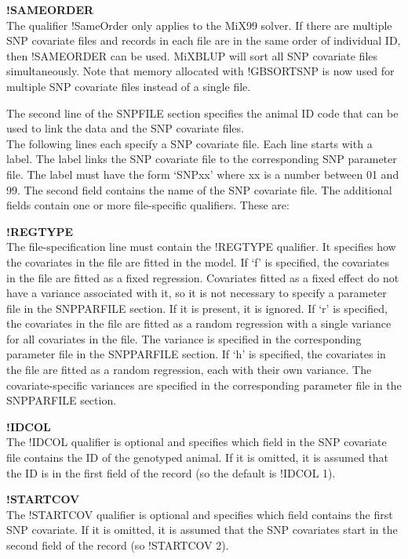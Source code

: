 \textbf{!SAMEORDER}\\
The qualifier !SameOrder only applies to the MiX99 solver. If there are
multiple SNP covariate files and records in each file are in the same
order of individual ID, then !SAMEORDER can be used. MiXBLUP will sort
all SNP covariate files simultaneously. Note that memory allocated with
!GBSORTSNP is now used for multiple SNP covariate files instead of a
single file.

The second line of the SNPFILE section specifies the animal ID code that
can be used to link the data and the SNP covariate files.\\
The following lines each specify a SNP covariate file. Each line starts
with a label. The label links the SNP covariate file to the
corresponding SNP parameter file. The label must have the form `SNPxx'
where xx is a number between 01 and 99. The second field contains the
name of the SNP covariate file. The additional fields contain one or
more file-specific qualifiers. These are:

\textbf{!REGTYPE}\\
The file-specification line must contain the !REGTYPE qualifier. It
specifies how the covariates in the file are fitted in the model. If `f'
is specified, the covariates in the file are fitted as a fixed
regression. Covariates fitted as a fixed effect do not have a variance
associated with it, so it is not necessary to specify a parameter file
in the SNPPARFILE section. If it is present, it is ignored. If `r' is
specified, the covariates in the file are fitted as a random regression
with a single variance for all covariates in the file. The variance is
specified in the corresponding parameter file in the SNPPARFILE section.
If `h' is specified, the covariates in the file are fitted as a random
regression, each with their own variance. The covariate-specific
variances are specified in the corresponding parameter file in the
SNPPARFILE section.

\textbf{!IDCOL}\\
The !IDCOL qualifier is optional and specifies which field in the SNP
covariate file contains the ID of the genotyped animal. If it is
omitted, it is assumed that the ID is in the first field of the record
(so the default is !IDCOL 1).

\textbf{!STARTCOV}\\
The !STARTCOV qualifier is optional and specifies which field contains
the first SNP covariate. If it is omitted, it is assumed that the SNP
covariates start in the second field of the record (so !STARTCOV 2).

